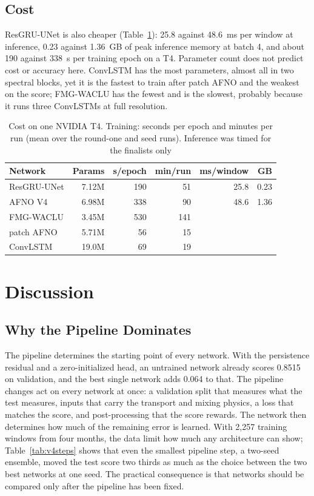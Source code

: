 \documentclass[journal]{IEEEtran}
\begin{document}
\subsection{Cost}
\label{sec:cost}
ResGRU-UNet is also cheaper (Table~\ref{tab:cost}): 25.8 against 48.6~ms per window at inference, 0.23 against 1.36~GB of peak inference memory at batch 4, and about 190 against 338~s per training epoch on a T4. Parameter count does not predict cost or accuracy here. ConvLSTM has the most parameters, almost all in two spectral blocks, yet it is the fastest to train after patch AFNO and the weakest on the score; FMG-WACLU has the fewest and is the slowest, probably because it runs three ConvLSTMs at full resolution.

\begin{table}[!htb]
\centering
\caption{Cost on one NVIDIA T4. Training: seconds per epoch and minutes per run (mean over the round-one and seed runs). Inference was timed for the finalists only}
\label{tab:cost}
\setlength{\tabcolsep}{3pt}
\begin{tabular}{@{}lrrrrr@{}}
\toprule
Network & Params & s/epoch & min/run & ms/window & GB \\
\midrule
ResGRU-UNet & 7.12M & 190 & 51 & 25.8 & 0.23 \\
AFNO V4 & 6.98M & 338 & 90 & 48.6 & 1.36 \\
FMG-WACLU & 3.45M & 530 & 141 & & \\
patch AFNO & 5.71M & 56 & 15 & & \\
ConvLSTM & 19.0M & 69 & 19 & & \\
\bottomrule
\end{tabular}
\end{table}

\section{Discussion}
\label{sec:discussion}
\subsection{Why the Pipeline Dominates}
The pipeline determines the starting point of every network. With the persistence residual and a zero-initialized head, an untrained network already scores 0.8515 on validation, and the best single network adds 0.064 to that. The pipeline changes act on every network at once: a validation split that measures what the test measures, inputs that carry the transport and mixing physics, a loss that matches the score, and post-processing that the score rewards. The network then determines how much of the remaining error is learned. With 2{,}257 training windows from four months, the data limit how much any architecture can show; Table~\ref{tab:v4steps} shows that even the smallest pipeline step, a two-seed ensemble, moved the test score two thirds as much as the choice between the two best networks at one seed. The practical consequence is that networks should be compared only after the pipeline has been fixed.
\end{document}
